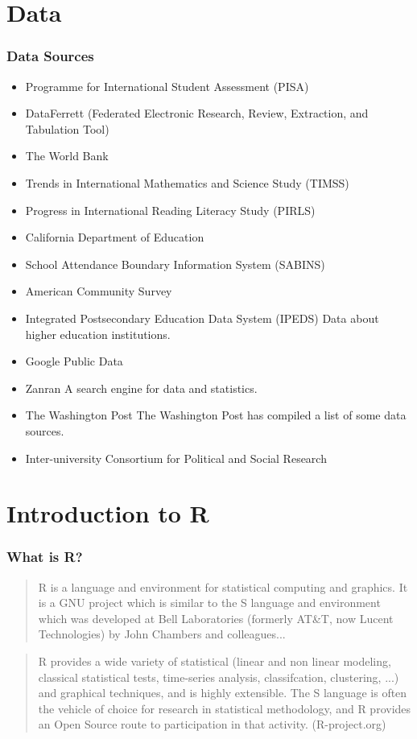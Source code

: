 \documentclass[10pt,slidestop,mathserif,c]{beamer}
\begin{document}
\section{Data}

\begin{frame}[fragile]
	\frametitle{Data Sources}
	
	\begin{itemize}
		\item Programme for International Student Assessment (PISA) 
		\item DataFerrett (Federated Electronic Research, Review, Extraction, and Tabulation Tool)
		\item The World Bank
		\item Trends in International Mathematics and Science Study (TIMSS)
		\item Progress in International Reading Literacy Study (PIRLS)
		\item California Department of Education
		\item School Attendance Boundary Information System (SABINS)
		\item American Community Survey
		\item Integrated Postsecondary Education Data System (IPEDS) Data about higher education institutions. 
		\item Google Public Data
		\item Zanran A search engine for data and statistics.
		\item The Washington Post The Washington Post has compiled a list of some data sources.
		\item Inter-university Consortium for Political and Social Research
	\end{itemize}
\end{frame}

\section{Introduction to R}

\begin{frame}
	\frametitle{What is R?}
	\begin{quote}R is a language and environment for statistical computing and graphics. It is a GNU project which is similar to the S language and environment which was developed at Bell Laboratories (formerly AT\&T, now Lucent Technologies) by John Chambers and colleagues...
	\end{quote}
	\pause
	\begin{quote}
	R provides a wide variety of statistical (linear and non linear modeling, classical statistical tests, time-series analysis, classifcation, clustering, ...) and graphical techniques, and is highly extensible. The S language is often the vehicle of choice for research in statistical methodology, and R provides an Open Source route to participation in that activity.
	(R-project.org)
	\end{quote}
\end{frame}
\end{document}

